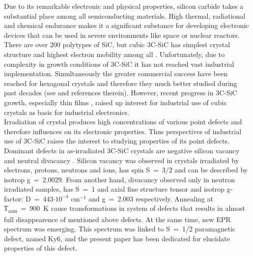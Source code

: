 Due to its remarkable electronic and physical properties, silicon carbide takes a substantial place among all semiconducting materials. High thermal, radiational and chemical endurance makes it a significant substance for developing electronic devices that can be used in severe environments like space or nuclear reactors.\\
\indent There are over 200 polytypes of SiC, but cubic 3C-SiC has simplest crystal structure and highest electron mobility among all \citep{choy1}. Unfortunately, due to complexity in growth conditions of 3C-SiC it has not reached vast industrial implementation. Simultaneously the greater commercial success have been reached for hexagonal crystals and therefore they much better studied during past decades (see \citep{hex1, hex2} and references therein). However, recent progress in 3C-SiC growth, especially thin films \citep{epilay}, raised up interest for industrial use of cubic crystals as basis for industrial electronics.\\
\indent Irradiation of crystal produces high concentrations of various point defects and therefore influences on its electronic properties. Thus perspectives of industrial use of 3C-SiC raises the interest to studying properties of its point defects. Dominant defects in as-irradiated 3C-SiC crystals are negative silicon vacancy \citep{t1} and neutral divacancy \citep{ky5}. Silicon vacancy was observed in crystals irradiated by electrons, protons, neutrons and ions, has spin S~=~3/2 and can be described by isotrop g~=~2.0029. From another hand, divacancy observed only in neutron irradiated samples, has S~=~1 and axial fine structure tensor and isotrop g-factor: D~=~443$\cdot10^{-4}$ cm$^{-1}$ and g~=~2.003 respectively. Annealing at Т\textsubscript{ann}~=~900~K cause transformations in system of defects that results in almost full disappearence of mentioned above defects. At the same time, new EPR spectrum was emerging. This spectrum was linked to S~=~1/2 paramagnetic defect, named Ky6, and the present paper has been dedicated for elucidate properties of this defect.
